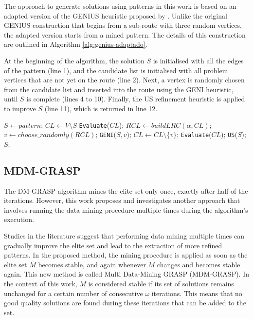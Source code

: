 \documentclass{singlecol-new}
\begin{document}
The approach to generate solutions using patterns in this work is based on an adapted version of the GENIUS heuristic proposed by \citet{daSilva}. Unlike the original GENIUS construction that begins from a sub-route with three random vertices, the adapted version starts from a mined pattern. The details of this construction are outlined in Algorithm \ref{alg:genius-adaptado}.

At the beginning of the algorithm, the solution $S$ is initialised with all the edges of the pattern (line 1), and the candidate list is initialised with all problem vertices that are not yet on the route (line 2). Next, a vertex is randomly chosen from the candidate list and inserted into the route using the GENI heuristic, until $S$ is complete (lines 4 to 10). Finally, the US refinement heuristic is applied to improve $S$ (line 11), which is returned in line 12.


\begin{algorithm}[!h]
	{\small
	\caption{\hspace{-1mm}:  GENIUS\_adapted($seed, \alpha, padrao$)}
	\label{alg:genius-adaptado}
	\begin{algorithmic}[1]			
		\STATE $S \gets pattern$;
		\STATE $CL \gets V \setminus S$
		\STATE \texttt{Evaluate}($CL$);
			\STATE $RCL \gets buildLRC(\alpha, CL)$;
			\STATE $v \gets choose\_randomly(RCL)$;
			\STATE \texttt{GENI}($S, v$);
			\STATE $CL \gets CL \setminus \{v\}$;
			\STATE \texttt{Evaluate}($CL$);
		\ENDWHILE
		\STATE \texttt{US}($S$);
		\RETURN $S$;
	\end{algorithmic}
}
\end{algorithm}



\subsection{MDM-GRASP}

The DM-GRASP algorithm mines the elite set only once, exactly after half of the iterations. However, this work proposes and investigates another approach that involves running the data mining procedure multiple times during the algorithm's execution.

Studies in the literature \cite{barbalho2013} suggest that performing data mining multiple times can gradually improve the elite set and lead to the extraction of more refined patterns. In the proposed method, the mining procedure is applied as soon as the elite set $M$ becomes stable, and again whenever $M$ changes and becomes stable again. This new method is called Multi Data-Mining GRASP (MDM-GRASP). In the context of this work, $M$ is considered stable if its set of solutions remains unchanged for a certain number of consecutive $\omega$ iterations. This means that no good quality solutions are found during these iterations that can be added to the set.
\end{document}
